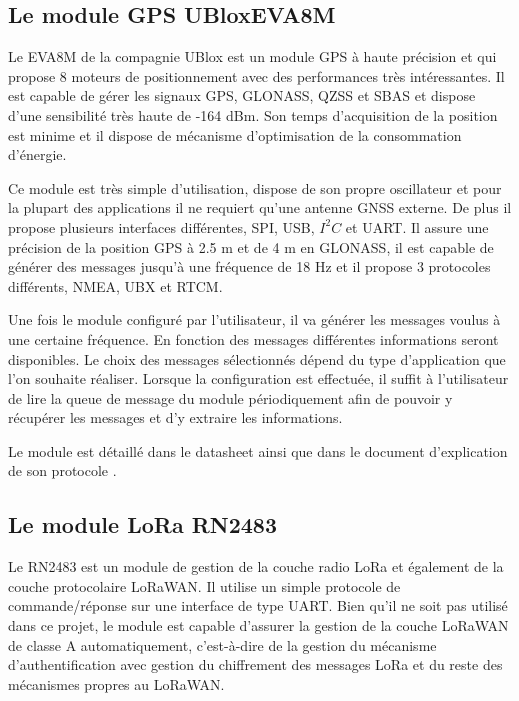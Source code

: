 \subsection{Le module GPS UBloxEVA8M}\label{ch:module_ubloxeva8m}

Le EVA8M de la compagnie UBlox est un module GPS à haute précision et qui propose 8 moteurs de positionnement avec des performances très intéressantes. Il est capable de gérer les signaux GPS, GLONASS, QZSS et SBAS et dispose d'une sensibilité très haute de -164 dBm. Son temps d'acquisition de la position est minime et il dispose de mécanisme d'optimisation de la consommation d'énergie.

Ce module est très simple d'utilisation, dispose de son propre oscillateur et pour la plupart des applications il ne requiert qu'une antenne GNSS externe. De plus il propose plusieurs interfaces différentes, SPI, USB, $I^{2}C$ et UART. Il assure une précision de la position GPS à 2.5 m et de 4 m en GLONASS, il est capable de générer des messages jusqu'à une fréquence de 18 Hz et il propose 3 protocoles différents, NMEA, UBX et RTCM.

Une fois le module configuré par l'utilisateur, il va générer les messages voulus à une certaine fréquence. En fonction des messages différentes informations seront disponibles. Le choix des messages sélectionnés dépend du type d'application que l'on souhaite réaliser. Lorsque la configuration est effectuée, il suffit à l'utilisateur de lire la queue de message du module périodiquement afin de pouvoir y récupérer les messages et d'y extraire les informations.

Le module est détaillé dans le datasheet \cite{ublox-datasheet} ainsi que dans le document d'explication de son protocole \cite{ublox-protocol}.

\subsection{Le module LoRa RN2483}\label{ch:module_rn2483}

Le RN2483 est un module de gestion de la couche radio LoRa et également de la couche protocolaire LoRaWAN. Il utilise un simple protocole de commande/réponse sur une interface de type UART. Bien qu'il ne soit pas utilisé dans ce projet, le module est capable d'assurer la gestion de la couche LoRaWAN de classe A automatiquement, c'est-à-dire de la gestion du mécanisme d'authentification avec gestion du chiffrement des messages LoRa et du reste des mécanismes propres au LoRaWAN.


